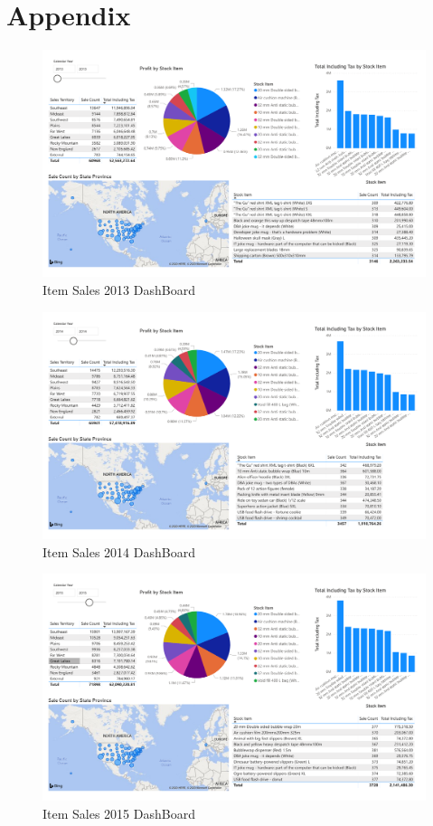 \documentclass[12pt]{article}
\begin{document}
\section{Appendix}
\appendix
\begin{figure}[H]
    \centering
    \includegraphics[width=18.5cm, angle=90]
    {images/Item sales2013.pdf}
    \caption{Item Sales 2013 DashBoard}
    \label{Item Sales 2013 DashBoard}
\end{figure}
\begin{figure}[H]
    \centering
    \includegraphics[width=18.5cm, angle=90]
    {images/Item sales2014.pdf}
    \caption{Item Sales 2014 DashBoard}
    \label{Item Sales 2014 DashBoard}
\end{figure}
\begin{figure}[H]
    \centering
    \includegraphics[width=18.5cm, angle=90]
    {images/Item sales2015.pdf}
    \caption{Item Sales 2015 DashBoard}
    \label{Item Sales 2015 DashBoard}
\end{figure}
\end{document}
